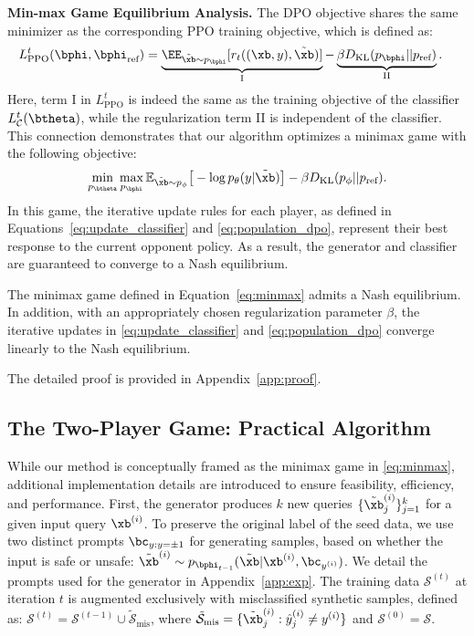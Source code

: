 \textbf{Min-max Game Equilibrium Analysis.} The DPO objective shares the same minimizer as the corresponding PPO training objective, which is defined as:
\begin{align*}
    & L_{\text{PPO}}^t(\bphi,\bphi_{\text{ref}}) = \underbrace{\EE_{\tilde{\xb} \sim p_{\bphi}}[r_t((\xb,y), \tilde{\xb})]}_{\text{I}} - \underbrace{\beta D_{\text{KL}}(p_{\bphi} || p_{\text{ref}})}_{\text{II}}.
\end{align*}
Here, term I in $L_{\text{PPO}}^t$ is indeed the same as the training objective of the classifier $L_{\mathcal{C}}^t(\btheta)$, while the regularization term II is independent of the classifier. This connection demonstrates that our algorithm optimizes a minimax game with the following objective:
\begin{align}
     \min_{p_{\btheta}} \max_{p_{\bphi}}   \mathbb{E}_{\substack{\tilde{\xb} \sim p_{\phi}}}\big[- \log p_{\theta} (y | \tilde \xb) \big] - 
     \beta  D_{\text{KL}}(p_{\phi} || p_{\text{ref}}). \label{eq:minmax}
\end{align}
In this game, the iterative update rules for each player, as defined in Equations~\eqref{eq:update_classifier} and \eqref{eq:population_dpo}, represent their best response to the current opponent policy. As a result, the generator and classifier are guaranteed to converge to a Nash equilibrium.  
\begin{theorem}\label{thm:main}
    The minimax game defined in Equation~\eqref{eq:minmax} admits a Nash equilibrium. In addition, with an appropriately chosen regularization parameter $\beta$, the iterative updates in \eqref{eq:update_classifier} and \eqref{eq:population_dpo} converge linearly to the Nash equilibrium. 
\end{theorem}
The detailed proof is provided in Appendix~\ref{app:proof}.

\subsection{The Two-Player Game: Practical Algorithm}\label{sec:practical}
While our method is conceptually framed as the minimax game in \eqref{eq:minmax}, additional implementation details are introduced to ensure feasibility, efficiency, and performance. 
First, the generator produces $k$ new queries $\{\tilde{\xb}_{j}^{(i)}\}_{j=1}^k$ 
for a given input query $\xb^{(i)}$. To preserve the original label of the seed data, we use two distinct prompts $\bc_{y:y=\pm 1}$ for generating samples, based on whether the input is safe or unsafe: 
$\tilde{\xb}^{(i)} \sim p_{\bphi_{t-1}}(\tilde{\xb} | \xb^{(i)}, \bc_{y^{(i)}})$. 
We detail the prompts used for the generator in Appendix~\ref{app:exp}. 
The training data $\mathcal{S}^{(t)}$ at iteration $t$ is augmented exclusively with misclassified synthetic samples, defined as: $\mathcal{S}^{(t)} = \mathcal{S}^{(t-1)} \cup \tilde{\mathcal{S}}_{\text{mis}}$, where $\tilde{\mathcal{S}}_{\text{mis}} = \{\tilde{\xb}_j^{(i)}: \hat{y}_j^{(i)} \neq y^{(i)}\}$ and $\mathcal{S}^{(0)}=\mathcal{S}$.

